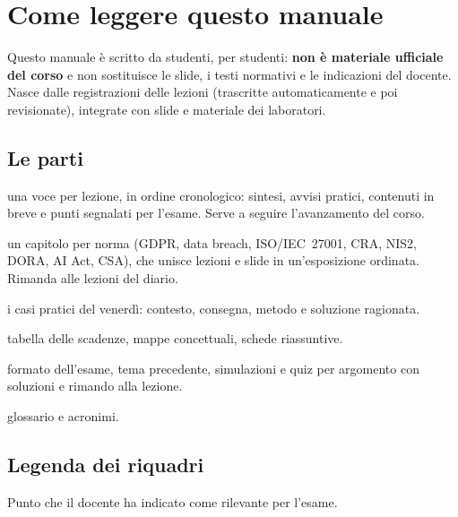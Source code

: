 \chapter*{Come leggere questo manuale}

Questo manuale è scritto da studenti, per studenti: \textbf{non è materiale ufficiale del corso} e non
sostituisce le slide, i testi normativi e le indicazioni del docente. Nasce dalle registrazioni delle
lezioni (trascritte automaticamente e poi revisionate), integrate con slide e materiale dei laboratori.

\section*{Le parti}
\begin{description}[leftmargin=2em,style=nextline]
  \item[Diario delle lezioni] una voce per lezione, in ordine cronologico: sintesi, avvisi pratici,
    contenuti in breve e punti segnalati per l'esame. Serve a seguire l'avanzamento del corso.
  \item[Manuale del corso] un capitolo per norma (GDPR, data breach, ISO/IEC~27001, CRA, NIS2, DORA,
    AI Act, CSA), che unisce lezioni e slide in un'esposizione ordinata. Rimanda alle lezioni del diario.
  \item[Laboratori] i casi pratici del venerdì: contesto, consegna, metodo e soluzione ragionata.
  \item[Schemi di ripasso] tabella delle scadenze, mappe concettuali, schede riassuntive.
  \item[Quiz ed esame] formato dell'esame, tema precedente, simulazioni e quiz per argomento con
    soluzioni e rimando alla lezione.
  \item[Appendice] glossario e acronimi.
\end{description}

\section*{Legenda dei riquadri}

\begin{esame}
Punto che il docente ha indicato come rilevante per l'esame.
\end{esame}

